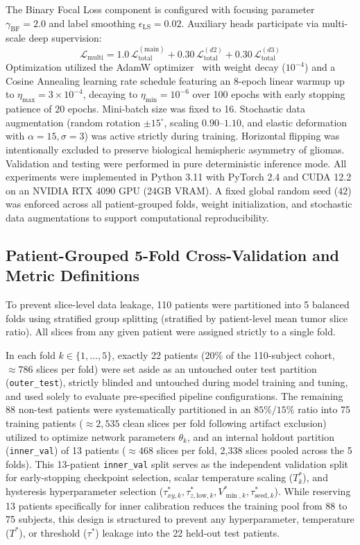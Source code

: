 \documentclass[11pt,a4paper]{article}
\begin{document}
The Binary Focal Loss component is configured with focusing parameter $\gamma_{\text{BF}} = 2.0$ and label smoothing $\epsilon_{\text{LS}} = 0.02$. Auxiliary heads participate via multi-scale deep supervision:
\begin{equation}
\label{eq:deep_supervision}
\mathcal{L}_{\text{multi}} = 1.0\,\mathcal{L}_{\text{total}}^{(\text{main})} + 0.30\,\mathcal{L}_{\text{total}}^{(d2)} + 0.30\,\mathcal{L}_{\text{total}}^{(d3)}
\end{equation}
Optimization utilized the AdamW optimizer~\cite{loshchilov2019decoupled} with weight decay ($10^{-4}$) and a Cosine Annealing learning rate schedule featuring an 8-epoch linear warmup up to $\eta_{\max} = 3 \times 10^{-4}$, decaying to $\eta_{\min} = 10^{-6}$ over 100 epochs with early stopping patience of 20 epochs. Mini-batch size was fixed to 16. Stochastic data augmentation (random rotation $\pm 15^\circ$, scaling $0.90$--$1.10$, and elastic deformation with $\alpha=15, \sigma=3$) was active strictly during training. Horizontal flipping was intentionally excluded to preserve biological hemispheric asymmetry of gliomas. Validation and testing were performed in pure deterministic inference mode. All experiments were implemented in Python 3.11 with PyTorch 2.4 and CUDA 12.2 on an NVIDIA RTX 4090 GPU (24GB VRAM). A fixed global random seed ($42$) was enforced across all patient-grouped folds, weight initialization, and stochastic data augmentations to support computational reproducibility.

\subsection{Patient-Grouped 5-Fold Cross-Validation and Metric Definitions}
To prevent slice-level data leakage, 110 patients were partitioned into 5 balanced folds using stratified group splitting (stratified by patient-level mean tumor slice ratio). All slices from any given patient were assigned strictly to a single fold.

In each fold $k \in \{1, \dots, 5\}$, exactly 22 patients ($20\%$ of the 110-subject cohort, $\approx 786$ slices per fold) were set aside as an untouched outer test partition (\texttt{outer\_test}), strictly blinded and untouched during model training and tuning, and used solely to evaluate pre-specified pipeline configurations. The remaining 88 non-test patients were systematically partitioned in an $85\% / 15\%$ ratio into 75 training patients ($\approx 2,535$ clean slices per fold following artifact exclusion) utilized to optimize network parameters $\theta_k$, and an internal holdout partition (\texttt{inner\_val}) of 13 patients ($\approx 468$ slices per fold, 2,338 slices pooled across the 5 folds). This 13-patient \texttt{inner\_val} split serves as the independent validation split for early-stopping checkpoint selection, scalar temperature scaling ($T_k^*$), and hysteresis hyperparameter selection ($\tau_{xy,k}^*, \tau_{z,\mathrm{low},k}^*, V_{\min,k}^*, \tau_{\mathrm{seed},k}^*$). While reserving 13 patients specifically for inner calibration reduces the training pool from 88 to 75 subjects, this design is structured to prevent any hyperparameter, temperature ($T^*$), or threshold ($\tau^*$) leakage into the 22 held-out test patients.
\end{document}
